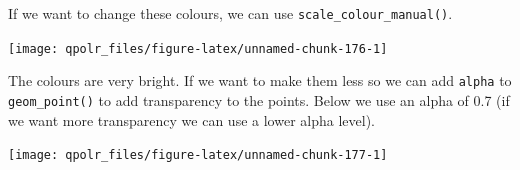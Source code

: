 \documentclass[12pt,oneside]{reedthesis}
\theoremstyle{definition}
\theoremstyle{definition}
\theoremstyle{definition}
\theoremstyle{remark}
\begin{document}
  If we want to change these colours, we can use
  \texttt{scale\_colour\_manual()}.
  \begin{Shaded}
  \begin{Highlighting}[]
  \NormalTok{(}\OperatorTok{+}
  \StringTok{  }\NormalTok{(}\NormalTok{(}\OperatorTok{+}\StringTok{ }
  \StringTok{  }\NormalTok{(}\NormalTok{, }\NormalTok{) }\OperatorTok{+}
  \StringTok{  }\NormalTok{() }\OperatorTok{+}
  \StringTok{  }\NormalTok{(} \NormalTok{(}\NormalTok{, }\NormalTok{, }\NormalTok{)) }
  \end{Highlighting}
  \end{Shaded}
  \begin{center}\texttt{[image: qpolr\_files/figure-latex/unnamed-chunk-176-1]} \end{center}
  
  The colours are very bright. If we want to make them less so we can add
  \texttt{alpha} to \texttt{geom\_point()} to add transparency to the
  points. Below we use an alpha of 0.7 (if we want more transparency we
  can use a lower alpha level).
  \begin{Shaded}
  \begin{Highlighting}[]
  \NormalTok{(}\OperatorTok{+}
  \StringTok{  }\NormalTok{(}\NormalTok{(}\NormalTok{) }\OperatorTok{+}\StringTok{ }
  \StringTok{  }\NormalTok{(}\NormalTok{, }\NormalTok{) }\OperatorTok{+}
  \StringTok{  }\NormalTok{() }\OperatorTok{+}
  \StringTok{  }\NormalTok{(} \NormalTok{(}\NormalTok{, }\NormalTok{, }\NormalTok{)) }
  \end{Highlighting}
  \end{Shaded}
  \begin{center}\texttt{[image: qpolr\_files/figure-latex/unnamed-chunk-177-1]} \end{center}
  
\end{document}

